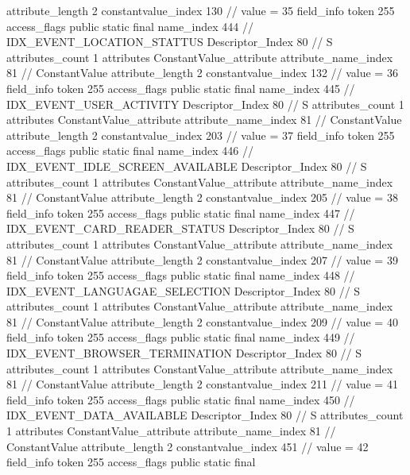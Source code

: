 {{{{{{{					attribute_length	2
					constantvalue_index	130		// value = 35
				}
				}
			}
			field_info {
				token	255
				access_flags	public static final
				name_index	444		// IDX_EVENT_LOCATION_STATTUS
				Descriptor_Index	80		// S
				attributes_count	1
				attributes {
				ConstantValue_attribute {
					attribute_name_index	81		// ConstantValue
					attribute_length	2
					constantvalue_index	132		// value = 36
				}
				}
			}
			field_info {
				token	255
				access_flags	public static final
				name_index	445		// IDX_EVENT_USER_ACTIVITY
				Descriptor_Index	80		// S
				attributes_count	1
				attributes {
				ConstantValue_attribute {
					attribute_name_index	81		// ConstantValue
					attribute_length	2
					constantvalue_index	203		// value = 37
				}
				}
			}
			field_info {
				token	255
				access_flags	public static final
				name_index	446		// IDX_EVENT_IDLE_SCREEN_AVAILABLE
				Descriptor_Index	80		// S
				attributes_count	1
				attributes {
				ConstantValue_attribute {
					attribute_name_index	81		// ConstantValue
					attribute_length	2
					constantvalue_index	205		// value = 38
				}
				}
			}
			field_info {
				token	255
				access_flags	public static final
				name_index	447		// IDX_EVENT_CARD_READER_STATUS
				Descriptor_Index	80		// S
				attributes_count	1
				attributes {
				ConstantValue_attribute {
					attribute_name_index	81		// ConstantValue
					attribute_length	2
					constantvalue_index	207		// value = 39
				}
				}
			}
			field_info {
				token	255
				access_flags	public static final
				name_index	448		// IDX_EVENT_LANGUAGAE_SELECTION
				Descriptor_Index	80		// S
				attributes_count	1
				attributes {
				ConstantValue_attribute {
					attribute_name_index	81		// ConstantValue
					attribute_length	2
					constantvalue_index	209		// value = 40
				}
				}
			}
			field_info {
				token	255
				access_flags	public static final
				name_index	449		// IDX_EVENT_BROWSER_TERMINATION
				Descriptor_Index	80		// S
				attributes_count	1
				attributes {
				ConstantValue_attribute {
					attribute_name_index	81		// ConstantValue
					attribute_length	2
					constantvalue_index	211		// value = 41
				}
				}
			}
			field_info {
				token	255
				access_flags	public static final
				name_index	450		// IDX_EVENT_DATA_AVAILABLE
				Descriptor_Index	80		// S
				attributes_count	1
				attributes {
				ConstantValue_attribute {
					attribute_name_index	81		// ConstantValue
					attribute_length	2
					constantvalue_index	451		// value = 42
				}
				}
			}
			field_info {
				token	255
				access_flags	public static final
}}}}}
